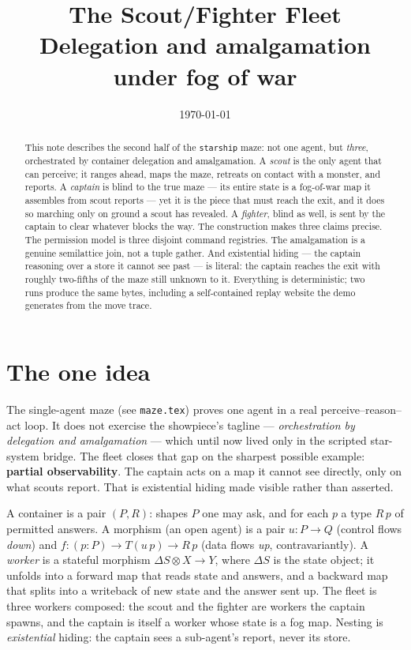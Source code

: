 \documentclass[11pt]{article}
\title{\textbf{The Scout/Fighter Fleet}\\[4pt]
  \large Delegation and amalgamation under fog of war}
\author{}
\date{\today}
\newcommand{\code}[1]{\texttt{#1}}
\begin{document}
\maketitle
\thispagestyle{empty}

\begin{abstract}
\noindent This note describes the second half of the \code{starship} maze: not one
agent, but \emph{three}, orchestrated by container delegation and amalgamation. A
\emph{scout} is the only agent that can perceive; it ranges ahead, maps the maze,
retreats on contact with a monster, and reports. A \emph{captain} is blind to the
true maze --- its entire state is a fog-of-war map it assembles from scout reports
--- yet it is the piece that must reach the exit, and it does so marching only on
ground a scout has revealed. A \emph{fighter}, blind as well, is sent by the captain
to clear whatever blocks the way. The construction makes three claims precise. The
permission model is three disjoint command registries. The amalgamation is a
genuine semilattice join, not a tuple gather. And existential hiding --- the captain
reasoning over a store it cannot see past --- is literal: the captain reaches the
exit with roughly two-fifths of the maze still unknown to it. Everything is
deterministic; two runs produce the same bytes, including a self-contained replay
website the demo generates from the move trace.
\end{abstract}

\section{The one idea}

The single-agent maze (see \code{maze.tex}) proves one agent in a real
perceive--reason--act loop. It does not exercise the showpiece's tagline ---
\emph{orchestration by delegation and amalgamation} --- which until now lived only in
the scripted star-system bridge. The fleet closes that gap on the sharpest possible
example: \textbf{partial observability}. The captain acts on a map it cannot see
directly, only on what scouts report. That is existential hiding made visible rather
than asserted.

A container is a pair $(P, R)$: shapes $P$ one may ask, and for each $p$ a type
$R\,p$ of permitted answers. A morphism (an open agent) is a pair $u : P \to Q$
(control flows \emph{down}) and $f : (p:P) \to T(u\,p) \to R\,p$ (data flows
\emph{up}, contravariantly). A \emph{worker} is a stateful morphism
$\Delta S \otimes X \to Y$, where $\Delta S$ is the state object; it unfolds into a
forward map that reads state and answers, and a backward map that splits into a
writeback of new state and the answer sent up. The fleet is three workers composed:
the scout and the fighter are workers the captain spawns, and the captain is itself
a worker whose state is a fog map. Nesting is \emph{existential} hiding: the captain
sees a sub-agent's report, never its store.
\end{document}
